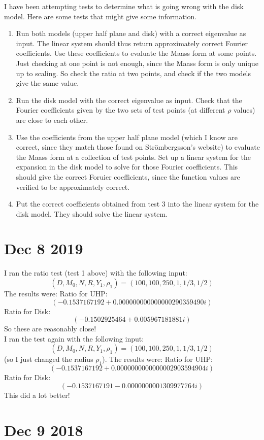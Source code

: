 \documentclass[]{article}
\begin{document}
I have been attempting tests to determine what is going wrong with the disk model.
Here are some tests that might give some information.
\begin{enumerate}
	\item Run both models (upper half plane and disk) with a correct eigenvalue as input.
	The linear system should thus return approximately correct Fourier coefficients.
	Use these coefficients to evaluate the Maass form at some points.
	Just checking at one point is not enough, since the Maass form is only unique up to scaling.
	So check the ratio at two points, and check if the two models give the same value.
	\item Run the disk model with the correct eigenvalue as input.
	Check that the Fourier coefficients given by the two sets of test points (at different $\rho$ values) are close to each other.
	\item Use the coefficients from the upper half plane model (which I know are correct, since they match those found on Str\"ombergsson's website) to evaluate the Maass form at a collection of test points.
	Set up a linear system for the expansion in the disk model to solve for those Fourier coefficients.
	This should give the correct Foruier coefficients, since the function values are verified to be approximately correct.
	\item Put the correct coefficients obtained from test 3 into the linear system for the disk model.
	They should solve the linear system.
\end{enumerate}

\section*{Dec 8 2019}

I ran the ratio test (test 1 above) with the following input:
$$
(D, M_0, N, R, Y_1, \rho_1) = (100, 100, 250, 1, 1/3, 1/2)
$$
The results were:
Ratio for UHP:
$$
(-0.1537167192 + 0.000000000000000290359490i)
$$
Ratio for Disk:
$$
(-0.1502925464 + 0.005967181881i)
$$
So these are reasonably close!
\\

I ran the test again with the following input:
$$
(D, M_0, N, R, Y_1, \rho_1) = (100, 100, 250, 1, 1/3, 1/2)
$$
(so I just changed the radius $\rho_1$).
The results were:
Ratio for UHP:
$$
(-0.1537167192 + 0.0000000000000002903594904i)
$$
Ratio for Disk:
$$
(-0.1537167191 - 0.0000000001309977764i) 
$$
This did a lot better!

\section*{Dec 9 2018}
\end{document}
